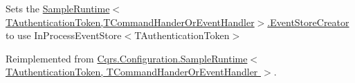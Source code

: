 Sets the \hyperlink{classCqrs_1_1Configuration_1_1SampleRuntime_a9038dd478bcafb2f5f65cbcbada712db_a9038dd478bcafb2f5f65cbcbada712db}{Sample\+Runtime$<$\+T\+Authentication\+Token,\+T\+Command\+Hander\+Or\+Event\+Handler$>$.\+Event\+Store\+Creator} to use In\+Process\+Event\+Store$<$\+T\+Authentication\+Token$>$ 



Reimplemented from \hyperlink{classCqrs_1_1Configuration_1_1SampleRuntime_a08ac580aad6ab03f16fd3171f21dfe59_a08ac580aad6ab03f16fd3171f21dfe59}{Cqrs.\+Configuration.\+Sample\+Runtime$<$ T\+Authentication\+Token, T\+Command\+Hander\+Or\+Event\+Handler $>$}.

